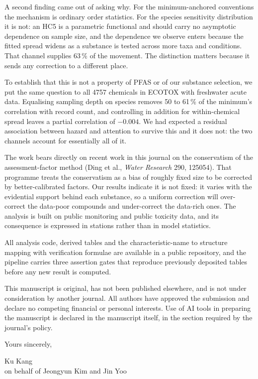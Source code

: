 \documentclass[11pt]{article}
\begin{document}
A second finding came out of asking why. For the minimum-anchored conventions
the mechanism is ordinary order statistics. For the species sensitivity
distribution it is not: an HC5 is a parametric functional and should carry no
asymptotic dependence on sample size, and the dependence we observe enters
because the fitted spread widens as a substance is tested across more taxa and
conditions. That channel supplies 63\,\% of the movement. The distinction
matters because it sends any correction to a different place.

To establish that this is not a property of PFAS or of our substance selection,
we put the same question to all 4757 chemicals in ECOTOX with freshwater acute
data. Equalising sampling depth on species removes 50 to 61\,\% of the
minimum's correlation with record count, and controlling in addition for
within-chemical spread leaves a partial correlation of $-0.004$. We had
expected a residual association between hazard and attention to survive this
and it does not: the two channels account for essentially all of it.

The work bears directly on recent work in this journal on the conservatism of
the assessment-factor method (Ding et al., \textit{Water Research} 290,
125054). That programme treats the conservatism as a bias of roughly fixed size
to be corrected by better-calibrated factors. Our results indicate it is not
fixed: it varies with the evidential support behind each substance, so a
uniform correction will over-correct the data-poor compounds and under-correct
the data-rich ones. The analysis is built on public monitoring and public
toxicity data, and its consequence is expressed in stations rather than in
model statistics.

All analysis code, derived tables and the characteristic-name to structure
mapping with verification formulae are available in a public repository, and the
pipeline carries three assertion gates that reproduce previously deposited
tables before any new result is computed.

This manuscript is original, has not been published elsewhere, and is not under
consideration by another journal. All authors have approved the submission and
declare no competing financial or personal interests. Use of AI tools in
preparing the manuscript is declared in the manuscript itself, in the section
required by the journal's policy.

\vspace{4mm}
\noindent Yours sincerely,

\vspace{6mm}
\noindent Ku Kang\\
on behalf of Jeongyun Kim and Jin Yoo
\end{document}
